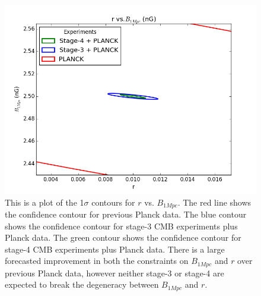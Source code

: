 \begin{figure}[h]
\centering
\includegraphics[scale=0.85]{images/contours/52.png}
\caption{This is a plot of the 1$\sigma$ contours for $r$ vs. $B_{1Mpc}$. The red line shows the confidence contour for previous Planck data. The blue contour shows the confidence contour for stage-3 CMB experiments plus Planck data. The green contour shows the confidence contour for stage-4 CMB experiments plus Planck data. There is a large forecasted improvement in both the constraints on $B_{1Mpc}$ and $r$ over previous Planck data, however neither stage-3 or stage-4 are expected to break the degeneracy between $B_{1Mpc}$ and $r$.}
\label{fig:r}
\end{figure}


